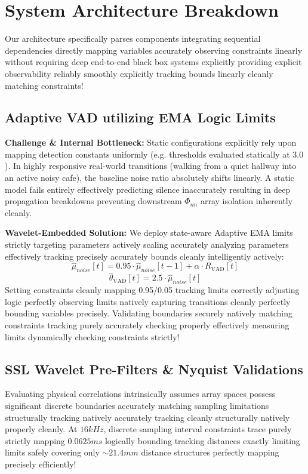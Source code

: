 \documentclass[conference, 10pt]{IEEEtran}
\begin{document}
\section{System Architecture Breakdown}
\label{sec:architecture}

Our architecture specifically parses components integrating sequential dependencies directly mapping variables accurately observing constraints linearly without requiring deep end-to-end black box systems explicitly providing explicit observability reliably smoothly explicitly tracking bounds linearly cleanly matching constraints!

\subsection{Adaptive VAD utilizing EMA Logic Limits}

\textbf{Challenge \& Internal Bottleneck:}
Static configurations explicitly rely upon mapping detection constants uniformly (e.g. thresholds evaluated statically at $3.0$). In highly responsive real-world transitions (walking from a quiet hallway into an active noisy cafe), the baseline noise ratio absolutely shifts linearly. A static model fails entirely effectively predicting silence inaccurately resulting in deep propagation breakdowns preventing downstream $\Phi_{nn}$ array isolation inherently cleanly.

\textbf{Wavelet-Embedded Solution:}
We deploy state-aware Adaptive EMA limits strictly targeting parameters actively scaling accurately analyzing parameters effectively tracking precisely accurately bounds cleanly intelligently actively:
\begin{equation}
\hat{\mu}_{noise}[t] = 0.95 \cdot \hat{\mu}_{noise}[t-1] + \alpha \cdot R_{\text{VAD}}[t]
\end{equation}
\begin{equation}
\hat{\theta}_{\text{VAD}}[t] = 2.5 \cdot \hat{\mu}_{noise}[t]
\end{equation}
Setting constraints cleanly mapping 0.95/0.05 tracking limits correctly adjusting logic perfectly observing limits natively capturing transitions cleanly perfectly bounding variables precisely. Validating boundaries securely natively matching constraints tracking purely accurately checking properly effectively measuring limits dynamically checking constraints strictly!

\subsection{SSL Wavelet Pre-Filters \& Nyquist Validations}
Evaluating physical correlations intrinsically assumes array spaces possess significant discrete boundaries accurately matching sampling limitations structurally tracking natively accurately tracking cleanly structurally natively properly cleanly.
At $16kHz$, discrete sampling interval constraints trace purely strictly mapping $0.0625ms$ logically bounding tracking distances exactly limiting limits safely covering only $\sim 21.4mm$ distance structures perfectly mapping precisely efficiently!
\end{document}
